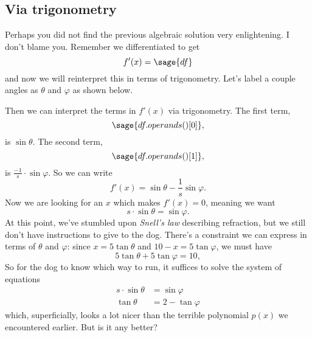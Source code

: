 \documentclass[12pt]{handout}
\newcommand{\meters}{\mathrm{m}}
\begin{document}
\pagebreak

\subsection*{Via trigonometry}

Perhaps you did not find the previous algebraic solution very enlightening.  I don't blame you.  Remember we differentiated to get
\[
f'(x) = \sage{df}
\]
and now we will reinterpret this in terms of trigonometry.  Let's label a couple angles as $\theta$ and $\varphi$ as shown below.
\begin{center}

\end{center}
Then we can interpret the terms in $f'(x)$ via trigonometry.  The first term,
\[
\sage{df.operands()[0]},
\]
is $\sin \theta$.  The second term,
\[
\sage{df.operands()[1]},
\]
is $\displaystyle\frac{-1}{s} \cdot \sin \varphi$.  So we can write
\[
f'(x) = \sin \theta - \frac{1}{s} \sin \varphi.
\]
Now we are looking for an $x$ which makes $f'(x) = 0$, meaning we want
\[
s \cdot \sin \theta = \sin \varphi.
\]
At this point, we've stumbled upon \textit{Snell's law} describing
refraction, but we still don't have instructions to give to the dog.
There's a constraint we can express in terms of $\theta$ and
$\varphi$: since $x = 5 \tan \theta$ and $10 - x = 5 \tan \varphi$, we must have
\[
5 \tan \theta + 5 \tan \varphi = 10,
\]
So for the dog to know which way to run, it suffices to solve the system of equations
\begin{align*}
s \cdot \sin \theta &= \sin \varphi \\
\tan \theta &= 2 - \tan \varphi
\end{align*}
which, superficially, looks a lot nicer than the terrible polynomial $p(x)$ we encountered earlier.  But is it any better?
\end{document}
